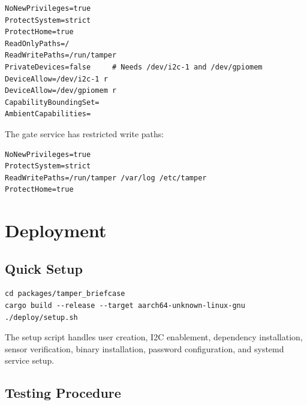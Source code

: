 \documentclass[11pt,letterpaper]{article}
\begin{document}
\begin{lstlisting}
NoNewPrivileges=true
ProtectSystem=strict
ProtectHome=true
ReadOnlyPaths=/
ReadWritePaths=/run/tamper
PrivateDevices=false     # Needs /dev/i2c-1 and /dev/gpiomem
DeviceAllow=/dev/i2c-1 r
DeviceAllow=/dev/gpiomem r
CapabilityBoundingSet=
AmbientCapabilities=
\end{lstlisting}

The gate service has restricted write paths:

\begin{lstlisting}
NoNewPrivileges=true
ProtectSystem=strict
ReadWritePaths=/run/tamper /var/log /etc/tamper
ProtectHome=true
\end{lstlisting}


\section{Deployment}

\subsection{Quick Setup}

\begin{lstlisting}
cd packages/tamper_briefcase
cargo build --release --target aarch64-unknown-linux-gnu
./deploy/setup.sh
\end{lstlisting}

The setup script handles user creation, I2C enablement, dependency installation, sensor verification, binary installation, password configuration, and systemd service setup.

\subsection{Testing Procedure}
\end{document}
